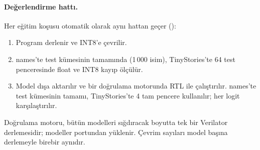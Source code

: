 \paragraph{Değerlendirme hattı.} Her eğitim koşusu otomatik olarak aynı hattan geçer ():
\begin{enumerate}
  \item Program derlenir ve INT8'e çevrilir.
  \item names'te test kümesinin tamamında (1\,000 isim), TinyStories'te 64 test penceresinde float ve INT8 kayıp ölçülür.
  \item Model dışa aktarılır ve bir doğrulama motorunda RTL ile çalıştırılır. names'te test kümesinin tamamı, TinyStories'te
  4 tam pencere kullanılır; her logit karşılaştırılır.
\end{enumerate}
Doğrulama motoru, bütün modelleri sığdıracak boyutta tek bir Verilator derlemesidir; modeller  portundan
yüklenir. Çevrim sayıları model başına derlemeyle birebir aynıdır.
